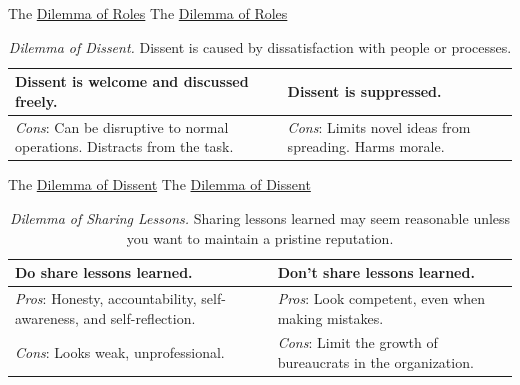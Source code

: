 The \href{table:number_of_roles}{Dilemma of Roles}
The \href{table:number_of_roles}{Dilemma of Roles}


\begin{center}
\begin{table}[H] %
\begin{tabular}{ | m{\dilemmatablewidth}| m{\dilemmatablewidth} | } 
  \hline
  \textbf{Dissent is welcome and discussed freely.} & 
  \textbf{Dissent is suppressed.} \\ 
  \hline
  \textit{Cons}: Can be disruptive to normal operations. Distracts from the task. & 
  \textit{Cons}: Limits novel ideas from spreading. Harms morale. \\  
  \hline
\end{tabular}
\caption{
\textit{Dilemma of Dissent.}
Dissent is caused by dissatisfaction with people or processes. 
}
\label{table:how_dissent_is_responded_to}
\end{table}
\end{center}


The \href{table:how_dissent_is_responded_to}{Dilemma of Dissent}
The \href{table:how_dissent_is_responded_to}{Dilemma of Dissent}


\begin{center}
\begin{table}[H] %
\begin{tabular}{ | m{\dilemmatablewidth}| m{\dilemmatablewidth} | } 
  \hline
  \textbf{Do share lessons learned.} & 
  \textbf{Don't share lessons learned.} \\ 
  \hline
  \textit{Pros}: Honesty, accountability, self-awareness, and self-reflection. & 
  \textit{Pros}: Look competent, even when making mistakes. \\  
  \hline
  \textit{Cons}: Looks weak, unprofessional. & 
  \textit{Cons}: Limit the growth of bureaucrats in the organization. \\  
  \hline
\end{tabular}
\caption{
\textit{Dilemma of Sharing Lessons.}
Sharing lessons learned may seem reasonable unless you want to maintain a pristine reputation. 
}
\label{table:sharing_lessons_learned}
\end{table}
\end{center}


